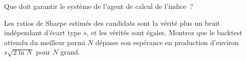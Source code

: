 \begin{interviewq}\label{iq:s2:quantitative-investment-strategies:5}
Que doit garantir le système de l'agent de calcul de l'indice~?
\end{interviewq}

\begin{interviewq}\label{iq:s2:quantitative-investment-strategies:6}
Les ratios de Sharpe estimés des candidats sont la vérité plus un bruit indépendant d'écart type $s$, et les vérités sont égales. Montrez que le
backtest attendu du meilleur parmi $N$ dépasse son espérance en production d'environ $s\sqrt{2\ln N}$ pour $N$ grand.
\end{interviewq}
